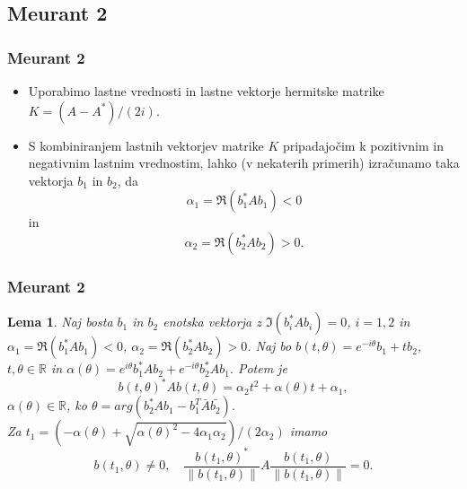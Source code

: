 \documentclass{beamer}
\newcommand{\norm}[1]{\left\lVert#1\right\rVert}
\newcommand{\R}{\mathbb R}
\newtheorem{lema}[izrek]{Lema}
\begin{document}
\subsection{Meurant 2}
\begin{frame}
\frametitle{Meurant 2}
\begin{itemize}
\item Uporabimo lastne vrednosti in lastne vektorje hermitske matrike $K=(A-A^\ast)/(2i)$.
\item S kombiniranjem lastnih vektorjev matrike $K$ pripadajočim k pozitivnim in negativnim lastnim vrednostim, lahko (v nekaterih primerih) izračunamo taka vektorja $b_1$ in $b_2$, da $$\alpha_1=\Re(b_1^\ast Ab_1)<0$$ in $$\alpha_2=\Re(b_2^\ast Ab_2)>0.$$
\end{itemize}
\end{frame}
\begin{frame}
\frametitle{Meurant 2}
\begin{lema}\label{komp}
Naj bosta $b_1$ in $b_2$ enotska vektorja z $\Im(b_i^\ast Ab_i)=0$, $i=1,2$ in \medskip $\alpha_1=\Re(b_1^\ast Ab_1)<0$,  $\alpha_2=\Re(b_2^\ast Ab_2)>0$. Naj bo $b(t,\theta)=e^{-i\theta}b_1 + tb_2$, $t, \theta \in \R$ in  $\alpha(\theta)=e^{i\theta}b_1^\ast Ab_2 +e^{-i\theta}b_2^\ast Ab_1.$ Potem je 
$$b(t,\theta)^\ast Ab(t,\theta)=\alpha_2 t^2 +\alpha(\theta)t+\alpha_1,$$ 
$\alpha(\theta)\in\R$, ko $\theta=arg(b_2^\ast Ab_1 -b_1^T\bar{A}\bar{b_2}).$\medskip \\ Za $t_1 =(-\alpha(\theta) +\sqrt{\alpha(\theta)^2 -4\alpha_1\alpha_2})/(2\alpha_2)$  imamo 
$$b(t_1, \theta) \not=0,\quad  \frac{b(t_1,\theta)^\ast}{\norm{b(t_1,\theta)}}A\frac{b(t_1,\theta)}{\norm{b(t_1,\theta)}}=0.$$
\end{lema}
\end{frame}
\end{document}
